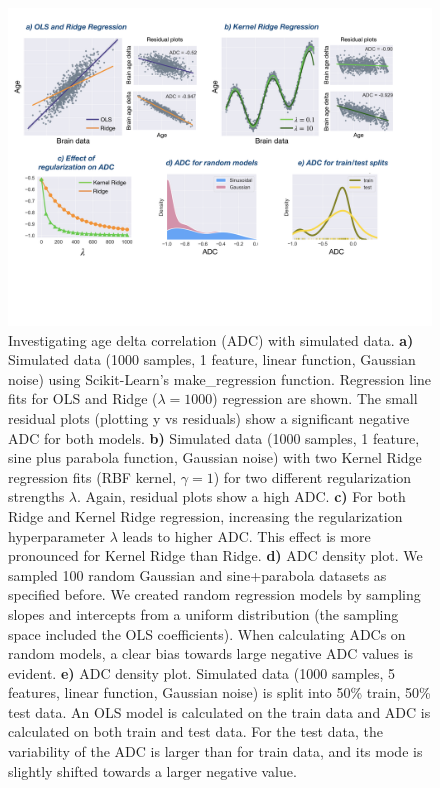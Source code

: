 \documentclass[utf8]{frontiersSCNS} %
\begin{document}
\begin{figure}[h!]
\begin{center}
\includegraphics[width=1.\textwidth]{figures/ADC.jpeg}
\end{center}
\caption{Investigating age delta correlation (ADC)  with simulated data. \textbf{a)} Simulated data (1000 samples, 1 feature, linear function, Gaussian noise) using Scikit-Learn's make\_regression function. Regression line fits for OLS and Ridge ($\lambda=1000$) regression are shown. The small residual plots (plotting y vs residuals) show a significant negative ADC for both models. \textbf{b)} Simulated data (1000 samples, 1 feature, sine plus parabola function, Gaussian noise) with two Kernel Ridge regression fits (RBF kernel, $\gamma=1$) for two different regularization strengths $\lambda$. Again, residual plots show a high ADC. \textbf{c)} For both Ridge and Kernel Ridge regression, increasing the regularization hyperparameter $\lambda$ leads to higher ADC. This effect is more pronounced for Kernel Ridge than Ridge. \textbf{d)} ADC density plot. We sampled 100 random Gaussian and sine+parabola datasets as specified before. We created random regression models by  sampling slopes and intercepts from a uniform distribution (the sampling space included the OLS coefficients). When calculating ADCs on random models, a clear bias towards large negative ADC values is evident. \textbf{e)} ADC density plot. Simulated data (1000 samples, 5 features, linear function, Gaussian noise) is split into 50\% train, 50\% test data. An OLS model is calculated on the train data and ADC is calculated on both train and test data. For the test data, the variability of the ADC is larger than for train data, and its mode is slightly shifted towards a larger negative value.}\label{fig:ADC}
\end{figure}
\end{document}
